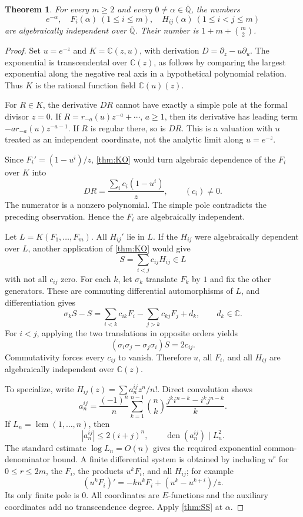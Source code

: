 \documentclass[11pt,a4paper]{article}
\numberwithin{equation}{section}
\newtheorem{theorem}{Theorem}[section]
\theoremstyle{definition}
\theoremstyle{remark}
\newcommand{\Qb}{\overline{\mathbb Q}}
\newcommand{\C}{\mathbb C}
\newcommand{\lcm}{\operatorname{lcm}}
\begin{document}
\begin{theorem}\label{thm:ein}
For every $m\ge2$ and every $0\ne\alpha\in\Qb$, the numbers
\[
 e^{-\alpha},\quad F_i(\alpha)\ (1\le i\le m),\quad
 H_{ij}(\alpha)\ (1\le i<j\le m)
\]
are algebraically independent over $\Qb$. Their number is
$1+m+\binom m2$.
\end{theorem}
\begin{proof}
Set $u=e^{-z}$ and $K=\C(z,u)$, with derivation
$D=\partial_z-u\partial_u$. The exponential is transcendental over
$\C(z)$, as follows by comparing the largest exponential along the negative
real axis in a hypothetical polynomial relation. Thus $K$ is the rational
function field $\C(u)(z)$.

For $R\in K$, the derivative $DR$ cannot have exactly a simple pole at the
formal divisor $z=0$. If
$R=r_{-a}(u)z^{-a}+\cdots$, $a\ge1$, then its derivative has leading term
$-a r_{-a}(u)z^{-a-1}$. If $R$ is regular there, so is $DR$. This is a
valuation with $u$ treated as an independent coordinate, not the analytic
limit along $u=e^{-z}$.

Since $F_i'=(1-u^i)/z$, \cref{thm:KO} would turn algebraic dependence of
the $F_i$ over $K$ into
\[
 DR=\frac{\sum_i c_i(1-u^i)}z,
 \qquad (c_i)\ne0.
\]
The numerator is a nonzero polynomial. The simple pole contradicts the
preceding observation. Hence the $F_i$ are algebraically independent.

Let $L=K(F_1,\ldots,F_m)$. All $H_{ij}'$ lie in $L$. If the $H_{ij}$ were
algebraically dependent over $L$, another application of \cref{thm:KO}
would give
\[
 S=\sum_{i<j}c_{ij}H_{ij}\in L
\]
with not all $c_{ij}$ zero. For each $k$, let $\sigma_k$ translate
$F_k$ by $1$ and fix the other generators. These are commuting differential
automorphisms of $L$, and differentiation gives
\[
 \sigma_kS-S=\sum_{i<k}c_{ik}F_i-\sum_{j>k}c_{kj}F_j+d_k,
 \qquad d_k\in\C.
\]
For $i<j$, applying the two translations in opposite orders yields
\[
 (\sigma_i\sigma_j-\sigma_j\sigma_i)S=2c_{ij}.
\]
Commutativity forces every $c_{ij}$ to vanish. Therefore $u$, all $F_i$,
and all $H_{ij}$ are algebraically independent over $\C(z)$.

To specialize, write $H_{ij}(z)=\sum a_n^{ij}z^n/n!$. Direct convolution
shows
\begin{equation}\label{eq:ein-coeff}
 a_n^{ij}=\frac{(-1)^n}{n}\sum_{k=1}^{n-1}
 \binom nk\frac{j^ki^{n-k}-i^kj^{n-k}}k.
\end{equation}
If $L_n=\lcm(1,\ldots,n)$, then
\[
 |a_n^{ij}|\le2(i+j)^n,\qquad
 \operatorname{den}(a_n^{ij})\mid L_n^2.
\]
The standard estimate $\log L_n=O(n)$ gives the required exponential
common-denominator bound. A finite differential system is obtained by
including $u^r$ for $0\le r\le2m$, the $F_i$, the products $u^kF_i$,
and all $H_{ij}$; for example
\[
 (u^kF_i)'=-ku^kF_i+(u^k-u^{k+i})/z.
\]
Its only finite pole is $0$. All coordinates are $E$-functions and the
auxiliary coordinates add no transcendence degree. Apply
\cref{thm:SS} at $\alpha$.
\end{proof}
\end{document}
